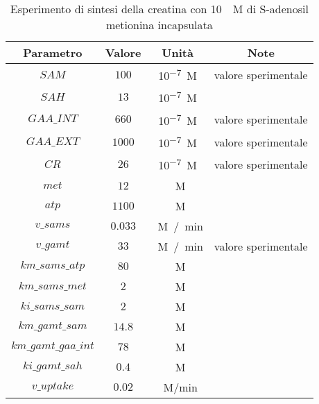 \begin{table}[H]
	\centering
	\begin{tabular}{| c | c | c | c |}
	\hline
	Parametro & Valore & Unit\`a & Note \\
		\hline
		$SAM$ & $100$ & \si{10^{-7} M} & valore sperimentale \\
		\hline
		$SAH$ & $13$ & \si{10^{-7} M} & \cite{oden1983s} \\
		\hline
		$GAA\_INT$ & $660$ & \si{10^{-7} M} & valore sperimentale \\
		\hline
		$GAA\_EXT$ & $1000$ & \si{10^{-7} M} & valore sperimentale \\
		\hline
		$CR$ & $26$ & \si{10^{-7} M} & valore sperimentale \\
		\hline
		$met$ & $12$ & \si{\mu M} &\cite{oden1983s} \\
		\hline
		$atp$ & $1100$ & \si{\mu M} & \cite{oden1983s} \\
		\hline
		$v\_sams$ & $0.033$ & \si{\mu M / min} & \cite{kim1974s} \\
		\hline
		$v\_gamt$ & $33$ & \si{\mu M / min} & valore sperimentale \\
		\hline
		$km\_sams\_atp$ & $80$ & \si{\mu M} & \cite{oden1983s} \\
		\hline
		$km\_sams\_met$ & $2$ & \si{\mu M} & \cite{oden1983s} \\
		\hline
		$ki\_sams\_sam$ & $2$ & \si{\mu M} & \cite{oden1983s} \\
		\hline
		$km\_gamt\_sam$ & $14.8$ & \si{\mu M} & \cite{ilas2000guanidinoacetate} \\
		\hline
		$km\_gamt\_gaa\_int$ & $78$ & \si{\mu M} & \cite{ilas2000guanidinoacetate} \\
		\hline
		$ki\_gamt\_sah$ & $0.4$ & \si{\mu M} &\cite{brendagamt} \\
		\hline
		$v\_uptake$ & $0.02$ & \si{\mu M/min} & \\
		\hline
	\end{tabular}
	\caption{Esperimento di sintesi della creatina con \SI{10}{\mu M} di S-adenosil metionina incapsulata}
	\label{mod:5}
\end{table}


